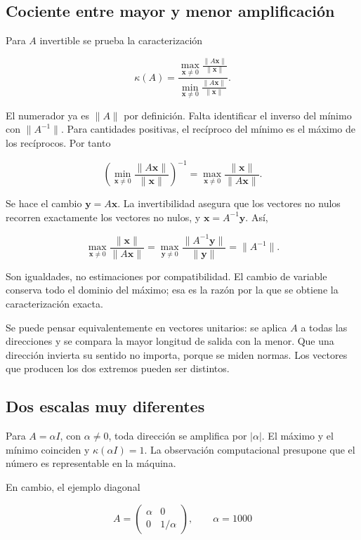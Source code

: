\documentclass[12pt,a4paper]{article}
\begin{document}
\subsection{Cociente entre mayor y menor amplificación}

Para $A$ invertible se prueba la caracterización

\[
\boxed{\kappa(A)=
\frac{\displaystyle\max_{\mathbf x\ne0}\frac{\|A\mathbf x\|}{\|\mathbf x\|}}
{\displaystyle\min_{\mathbf x\ne0}\frac{\|A\mathbf x\|}{\|\mathbf x\|}}}.
\]

El numerador ya es $\|A\|$ por definición. Falta identificar el inverso del mínimo con $\|A^{-1}\|$. Para cantidades positivas, el recíproco del mínimo es el máximo de los recíprocos. Por tanto

\[
\left(\min_{\mathbf x\ne0}\frac{\|A\mathbf x\|}{\|\mathbf x\|}\right)^{-1}
=\max_{\mathbf x\ne0}\frac{\|\mathbf x\|}{\|A\mathbf x\|}.
\]

Se hace el cambio $\mathbf y=A\mathbf x$. La invertibilidad asegura que los vectores no nulos recorren exactamente los vectores no nulos, y $\mathbf x=A^{-1}\mathbf y$. Así,

\[
\max_{\mathbf x\ne0}\frac{\|\mathbf x\|}{\|A\mathbf x\|}
=\max_{\mathbf y\ne0}\frac{\|A^{-1}\mathbf y\|}{\|\mathbf y\|}
=\|A^{-1}\|.
\]

Son igualdades, no estimaciones por compatibilidad. El cambio de variable conserva todo el dominio del máximo; esa es la razón por la que se obtiene la caracterización exacta.

Se puede pensar equivalentemente en vectores unitarios: se aplica $A$ a todas las direcciones y se compara la mayor longitud de salida con la menor. Que una dirección invierta su sentido no importa, porque se miden normas. Los vectores que producen los dos extremos pueden ser distintos.

\subsection{Dos escalas muy diferentes}

Para $A=\alpha I$, con $\alpha\ne0$, toda dirección se amplifica por $|\alpha|$. El máximo y el mínimo coinciden y $\kappa(\alpha I)=1$. La observación computacional presupone que el número es representable en la máquina.

En cambio, el ejemplo diagonal

\[
A=\begin{pmatrix}\alpha&0\\0&1/\alpha\end{pmatrix},\qquad \alpha=1000
\]
\end{document}
